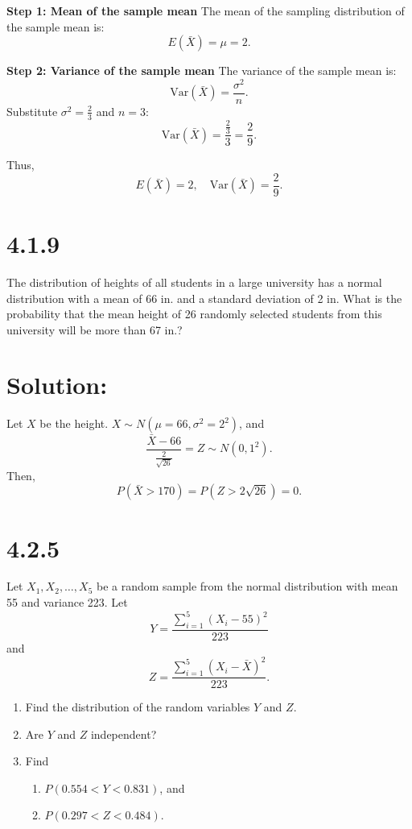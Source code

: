 \documentclass{article}
\begin{document}
\textbf{Step 1: Mean of the sample mean}  
The mean of the sampling distribution of the sample mean is:
\[
E(\bar{X}) = \mu = 2.
\]

\textbf{Step 2: Variance of the sample mean}  
The variance of the sample mean is:
\[
\text{Var}(\bar{X}) = \frac{\sigma^2}{n}.
\]
Substitute $\sigma^2 = \frac{2}{3}$ and $n = 3$:
\[
\text{Var}(\bar{X}) = \frac{\frac{2}{3}}{3} = \frac{2}{9}.
\]

Thus, 
\[
E(\bar{X}) = 2, \quad \text{Var}(\bar{X}) = \frac{2}{9}.
\]

\section*{4.1.9}

The distribution of heights of all students in a large university has a normal distribution with a mean of 66 in. and a standard deviation of 2 in. What is the probability that the mean height of 26 randomly selected students from this university will be more than 67 in.?


\section*{Solution:}

Let $X$ be the height. $X \sim N(\mu = 66, \sigma^2 = 2^2)$, and 
\[
\frac{\bar{X} - 66}{\frac{2}{\sqrt{26}}} = Z \sim N(0, 1^2).
\]
Then,
\[
P(\bar{X} > 170) = P\left(Z > 2\sqrt{26}\right) = 0.
\]


\section*{4.2.5}

Let $X_1, X_2, \dots, X_5$ be a random sample from the normal distribution with mean 55 and variance 223. Let
\[
Y = \frac{\sum_{i=1}^5 (X_i - 55)^2}{223}
\]
and
\[
Z = \frac{\sum_{i=1}^5 (X_i - \bar{X})^2}{223}.
\]

\begin{enumerate}
    \item[(a)] Find the distribution of the random variables $Y$ and $Z$.
    \item[(b)] Are $Y$ and $Z$ independent?
    \item[(c)] Find
    \begin{enumerate}
        \item[(i)] $P(0.554 < Y < 0.831)$, and
        \item[(ii)] $P(0.297 < Z < 0.484)$.
    \end{enumerate}
\end{enumerate}
\end{document}
